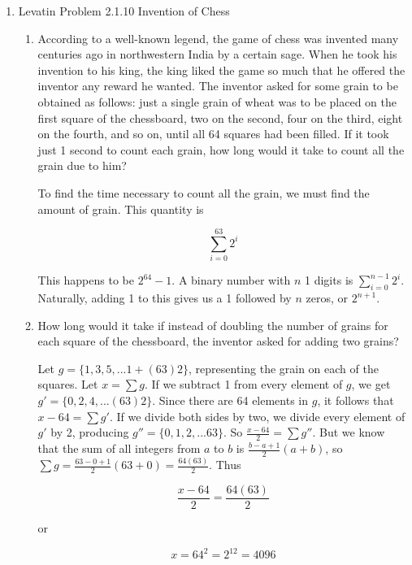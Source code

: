 \documentclass[a4paper,12pt]{article}
\begin{document}
\begin{enumerate}
    \item Levatin Problem 2.1.10
    Invention of Chess
    \begin{enumerate}
      \item According to a well-known legend, the game of chess was invented many centuries ago in northwestern India by a certain sage. When he took his invention to his king, the king liked the game so much that he offered the inventor any reward he wanted. The inventor asked for some grain to be obtained as follows: just a single grain of wheat was to be placed on the first square of the chessboard, two on the second, four on the third, eight on the fourth, and so on, until all 64 squares had been filled. If it took just 1 second to count each grain, how long would it take to count all the grain due to him?

      \vspace{5 mm}

      To find the time necessary to count all the grain, we must find the amount of grain. This quantity is 

      $$\sum_{i = 0}^{63} 2^i$$

      This happens to be $2^{64} - 1$. A binary number with $n$ 1 digits is $\sum_{i = 0}^{n-1} 2^i$. Naturally, adding 1 to this gives us a 1 followed by $n$ zeros, or $2^{n + 1}$.

      \item How long would it take if instead of doubling the number of grains for each square of the chessboard, the inventor asked for adding two grains?

      \vspace{5 mm}

      Let $g = \{1, 3, 5, ... 1 + (63)2\}$, representing the grain on each of the squares. Let $x = \sum g$. If we subtract 1 from every element of $g$, we get $g' = \{0, 2, 4, ... (63)2\}$. Since there are 64 elements in $g$, it follows that $x - 64 = \sum g'$. If we divide both sides by two, we divide every element of $g'$ by 2, producing $g'' = \{0, 1, 2, ... 63\}$. So $\frac{x - 64}{2} = \sum g''$. But we know that the sum of all integers from $a$ to $b$ is $\frac{b - a + 1}{2}\left(a + b\right)$, so $\sum g = \frac{63 - 0 + 1}{2}\left(63 + 0\right) = \frac{64(63)}{2}$. Thus

      $$\frac{x - 64}{2} = \frac{64(63)}{2}$$

      or

      $$x = 64^2 = 2^{12} = 4096$$


    \end{enumerate}


\end{enumerate}
\end{document}
